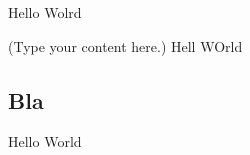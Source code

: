 \documentclass{article}
\begin{document}
Hello Wolrd
\begin{refsection}
(Type your content here.) \cite{abc} Hell WOrld
\printbibliography[heading=subbibintoc,title={Refs1}]
\end{refsection}
\begin{refsection}
\section*{Bla}
Hello World\cite{def}
\printbibliography[heading=subbibintoc,title={Refs2}]
\end{refsection}
\end{document}
